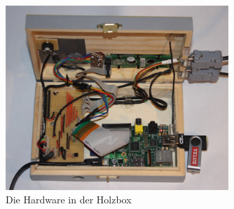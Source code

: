 \begin{figure}[h]
  \centering
     \includegraphics[width=0.75\textwidth]{figures/anschluss/3.jpg}
  \caption{Die Hardware in der Holzbox}
  \label{fig:holzbox}
\end{figure}